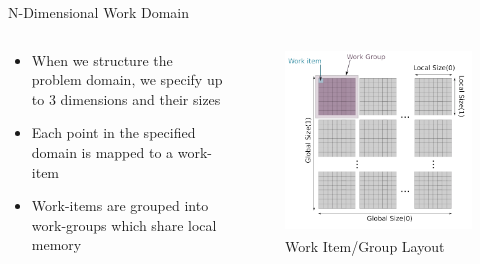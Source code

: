 \documentclass[10pt,aspectratio=169]{beamer} %
\begin{document}
\begin{frame}{N-Dimensional Work Domain}
\begin{columns}[c]
\begin{column}{0.5\textwidth}
\begin{itemize}
\item When we structure the problem domain, we specify up to 3 dimensions and their sizes
\item Each point in the specified domain is mapped to a work-item
\item Work-items are grouped into work-groups which share local memory
\end{itemize}
\end{column}%
\begin{column}{0.5\textwidth}
\begin{figure}
    \includegraphics[width=\textwidth]{WorkGI.png}
    \caption{Work Item/Group Layout \textsuperscript{\cite{Hong2016}}}
\end{figure}
\end{column}
\end{columns}
  
\end{frame}
\end{document}
